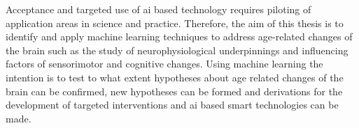 Acceptance and targeted use of \gls{ai} based technology requires piloting of application areas in science and practice. Therefore, the aim of this thesis is to identify and apply machine learning techniques to address age-related changes of the brain such as the study of neurophysiological underpinnings and influencing factors of sensorimotor and cognitive changes. Using machine learning the intention is to test to what extent hypotheses about age related changes of the brain can be confirmed, new hypotheses can be formed and derivations for the development of targeted interventions and \gls{ai} based smart technologies can be made.



